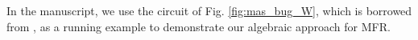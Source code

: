 In the manuscript, we use the circuit of Fig. \ref{fig:mas_bug_W},
which is borrowed from \cite{Vkrao:ISQED21}, as a running example to
demonstrate our algebraic approach for MFR.  




